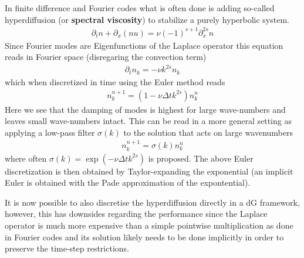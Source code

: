 In finite difference and Fourier codes what is often done is adding so-called hyperdiffusion
(or \textbf{spectral viscosity}) to stabilize a purely hyperbolic system.
\begin{align}
    \partial_t n + \partial_x( nu) = \nu (-1)^{s+1}\partial_x^{2s} n
\end{align}
Since Fourier modes are Eigenfunctions of the Laplace operator this equation reads in Fourier space (disregaring the convection term)
\begin{align}
    \partial_t n_k = -\nu k^{2s} n_k
\end{align}
which when discretized in time using the Euler method reads
\begin{align}
    n_k^{n+1} = (1-\nu\Delta t k^{2s}) n_k^{n}
\end{align}
Here we see that the damping of modes is highest for large wave-numbers and leaves small wave-numbers intact.
This can be read in a more general setting as applying a low-pass filter $\sigma(k)$ to the solution that acts on large wavenumbers
\begin{align}
    n_k^{n+1} = \sigma(k) n_k^{n}
\end{align}
where often $\sigma(k) = \exp( - \nu \Delta t k^{2s})$ is proposed. The above Euler discretization is
then obtained by Taylor-expanding the exponential
(an implicit Euler is obtained with the Pade approximation of the expontential).

It is now possible to also discretise the hyperdiffusion directly in a dG framework, however, this
has downsides regarding the performance since the Laplace operator is much more expensive than a
simple pointwise multiplication as done in Fourier codes and its solution likely needs to be done implicitly
in order to preserve the time-step restrictions.

